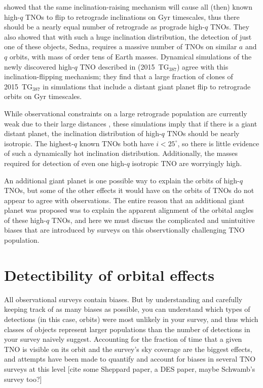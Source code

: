 \documentclass{aastex62}
\begin{document}
\citet{shankman17} showed that the same inclination-raising mechanism will cause all (then) known high-$q$ TNOs to flip to retrograde inclinations on Gyr timescales, thus there should be a nearly equal number of retrograde as prograde high-$q$ TNOs.
They also showed that with such a huge inclination distribution, the detection of just one of these objects, Sedna, requires a massive number of TNOs on similar $a$ and $q$ orbits, with mass of order tens of Earth masses.
Dynamical simulations of the newly discovered high-$q$ TNO described in \citet{sheppard18} (2015~TG$_{387}$) agree with this inclination-flipping mechanism; they find that a large fraction of clones of 2015~TG$_{387}$ in simulations that include a distant giant planet flip to retrograde orbits on Gyr timescales.

While observational constraints on a large retrograde population are currently weak due to their large distances \citep{lawler2017}, these simulations imply that if there is a giant distant planet, the inclination distribution of high-$q$ TNOs should be nearly isotropic.
The highest-$q$ known TNOs both have $i<25^{\circ}$, so there is little evidence of such a dynamically hot inclination distribution.
Additionally, the masses required for detection of even one high-$q$ isotropic TNO are worryingly high. 

An additional giant planet is one possible way to explain the orbits of high-$q$ TNOs, but some of the other effects it would have on the orbits of TNOs do not appear to agree with observations.
The entire reason that an additional giant planet was proposed was to explain the apparent alignment of the orbital angles of these high-$q$ TNOs, and here we must discuss the complicated and unintuitive biases that are introduced by surveys on this observtionally challenging TNO population.

\section{Detectibility of orbital effects}


All observational surveys contain biases.
But by understanding and carefully keeping track of as many biases as possible, you can understand which types of detections (in this case, orbits) were most unlikely in your survey, and thus which classes of objects represent larger populations than the number of detections in your survey naively suggest.
Accounting for the fraction of time that a given TNO is visible on its orbit and the survey's sky coverage are the biggest effects, and attempts have been made to quantify and account for biases in several TNO surveys at this level [cite some Sheppard paper, a DES paper, maybe Schwamb's survey too?]
\end{document}
